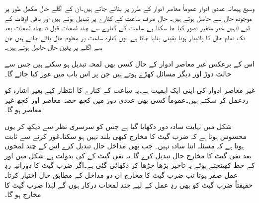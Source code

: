وسیع پیمانہ عددی ادوار عموماً معاصر ادوار کے طرز پر بنائے جاتے ہیں۔ان کے اگلے حال مکمل طور پر موجودہ حال سے حاصل ہوتے ہیں۔ حال صرف ساعت کے کنارے پر تبدیل ہوتے ہیں اور باقی اوقات کے لیے انہیں غیر متغیر تصور کیا جا سکتا ہے۔ساعت کے کنارے سے چند لمحات قبل تا چند لمحات بعد تک تمام حال کا پائیدار ہونا یقینی بنایا جاتا ہے۔یوں کنارہ ساعت پر معلوم حال پائے جاتے ہیں جن سے اگلے پر یقین حال حاصل ہوتے ہیں۔ 

اس کے برعکس غیر معاصر ادوار کے حال کسی بھی لمحہ تبدیل ہو سکتے ہیں جس سے حالت دوڑ اور دیگر مسائل کھڑے ہوتے ہیں جن پر اس باب میں غور کیا جائے گا۔

غیر معاصر ادوار کی اپنی ایک اہمیت ہے۔یہ ساعت کے کنارے کا انتظار کیے بغیر اشارہ کو ردعمل کر سکتے ہیں۔عموماً کسی بھی عددی دور میں کچھ حصہ معاصر اور کچھ غیر معاصر ہو گا۔

شکل  میں نہایت سادہ دور دکھایا گیا ہے جس کو سرسری نظر سے دیکھ کر یوں محسوس ہوتا ہے کہ ضرب گیٹ کا مخارج کبھی بلند نہیں ہو سکتا۔غور کرنے سے ثابت ہوتا ہے کہ مسئلہ اتنا سادہ نہیں۔ جب بھی مداخل  حال تبدیل کرے اس کے چند لمحوں بعد نفی گیٹ کا مخارج حال تبدیل کرے گا۔یہ  نفی گیٹ کے  کی بدولت ہے۔شکل میں  اور  کے خط کھینچتے ہوئے یہ تاخیر بڑھا چڑھا کر  دکھائی گئی ہے۔اگر ضرب گیٹ کا دورانیہ ردِ عمل صفر ہوتا تب ضرب گیٹ کا مخارج ان دو مداخل کے مطابق حال  اختیار کرتا۔حقیقتاً ضرب گیٹ کو بھی ردِ عمل کے لیے چند لمحات درکار ہوں گے لہٰذا ضرب گیٹ کا مخارج  ہو گا۔

